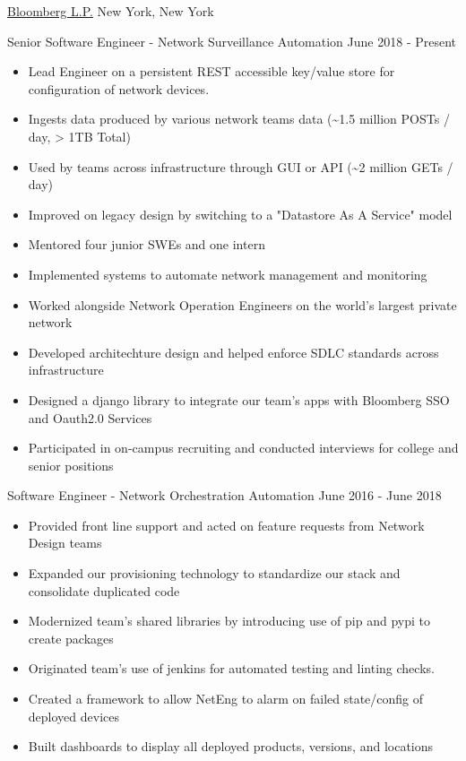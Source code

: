 \documentclass[11pt]{article}
\begin{document}
\headedsection  %
{\href{http://www.bloomberg.com/company}{Bloomberg L.P.}}
{New York, New York}
{
    \headedsubsection
    {Senior Software Engineer - Network Surveillance Automation}
    {June 2018 - Present}
    {
        \begin{itemize}
            \item Lead Engineer on a persistent REST accessible key/value store for configuration of network devices. 
            \item Ingests data produced by various network teams data (\textasciitilde{}1.5 million POSTs / day, > 1TB Total)
            \item Used by teams across infrastructure through GUI or API (\textasciitilde{}2 million GETs / day)
            \item Improved on legacy design by switching to a "Datastore As A Service" model
            \item Mentored four junior SWEs and one intern
            \item Implemented systems to automate network management and monitoring
            \item Worked alongside Network Operation Engineers on the world's largest private network
            \item Developed architechture design and helped enforce SDLC standards across infrastructure
            \item Designed a django library to integrate our team's apps with Bloomberg SSO and Oauth2.0 Services
            \item Participated in on-campus recruiting and conducted interviews for college and senior positions
        \end{itemize}

    }
    \headedsubsection
    {Software Engineer - Network Orchestration Automation}
    {June 2016 - June 2018}
    {
        \begin{itemize}
            \item Provided front line support and acted on feature requests from Network Design teams
            \item Expanded our provisioning technology to standardize our stack and consolidate duplicated code
            \item Modernized team's shared libraries by introducing use of pip and pypi to create packages 
            \item Originated team's use of jenkins for automated testing and linting checks.
            \item Created a framework to allow NetEng to alarm on failed state/config of deployed devices
            \item Built dashboards to display all deployed products, versions, and locations
        \end{itemize}

}}
\end{document}
